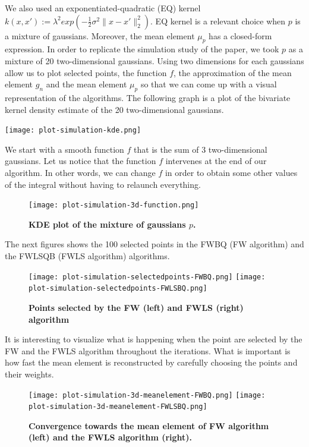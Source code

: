 We also used an exponentiated-quadratic (EQ) kernel $k(x, x') := \lambda^{2} exp(-\frac{1}{2}\sigma^{2} \| x-x' \|_{2}^{2} )$. EQ kernel is a relevant choice when $p$ is a mixture of gaussians. Moreover, the mean element $\mu_{p}$ has a closed-form expression.
In order to replicate the simulation study of the paper, we took $p$ as a mixture of 20 two-dimensional gaussians. Using two dimensions for each gaussians allow us to plot selected points, the function $f$, the approximation of the mean element $g_n$ and the mean element $\mu_{p}$ so that we can come up with a visual representation of the algorithms.
\newpage
The following graph is a plot of the bivariate kernel density estimate of the 20 two-dimensional gaussians. \\
\begin{center}
	\texttt{[image: plot-simulation-kde.png]}
\end{center}
We start with a smooth function $f$ that is the sum of 3 two-dimensional gaussians. Let us notice that the function $f$ intervenes at the end of our algorithm. In other words, we can change $f$ in order to obtain some other values of the integral without having to relaunch everything.
\begin{figure}[H]
\begin{center}
	\texttt{[image: plot-simulation-3d-function.png]}
	\caption{\textbf{KDE plot of the mixture of gaussians $p$.}}
\end{center}
\end{figure}
The next figures shows the 100 selected points in the FWBQ (FW algorithm) and the FWLSQB (FWLS algorithm) algorithms.
\begin{figure}[H]
\begin{center}
	\texttt{[image: plot-simulation-selectedpoints-FWBQ.png]}
	\texttt{[image: plot-simulation-selectedpoints-FWLSBQ.png]}
	\caption{\textbf{Points selected by the FW (left) and FWLS (right) algorithm}}
\end{center}
\end{figure}
It is interesting to visualize what is happening when the point are selected by the FW and the FWLS algorithm throughout the iterations. What is important is how fast the mean element is reconstructed by carefully choosing the points and their weights.
\begin{figure}[H]
\begin{center}
	\texttt{[image: plot-simulation-3d-meanelement-FWBQ.png]}
	\texttt{[image: plot-simulation-3d-meanelement-FWLSBQ.png]}
	\caption{\textbf{Convergence towards the mean element of FW algorithm (left) and the FWLS algorithm (right).}}
\end{center}
\end{figure}
